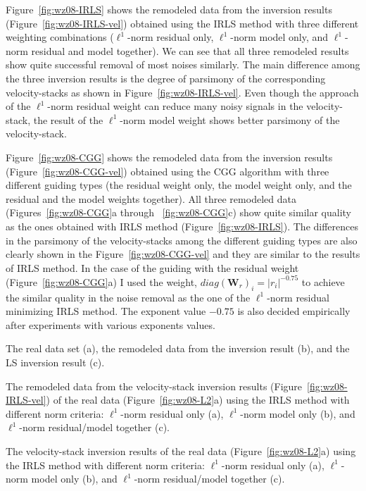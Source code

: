 Figure~\ref{fig:wz08-IRLS} shows the remodeled data
from the inversion results (Figure~\ref{fig:wz08-IRLS-vel}) obtained using the IRLS method 
with three different weighting combinations ($\ell^1$-norm residual only, $\ell^1$-norm model only,
and $\ell^1$-norm residual and model together).
We can see that all three remodeled results show quite successful removal of most noises similarly.
The main difference among the three inversion results is the degree of parsimony 
of the corresponding velocity-stacks as shown in Figure~\ref{fig:wz08-IRLS-vel}.
Even though the approach of the $\ell^1$-norm residual weight can reduce many noisy signals in 
the velocity-stack, the result of the $\ell^1$-norm model weight shows better parsimony of the velocity-stack.

Figure~\ref{fig:wz08-CGG} shows the remodeled data
from the inversion results (Figure~\ref{fig:wz08-CGG-vel})
obtained using the CGG algorithm with three different guiding types
(the residual weight only, the model weight only,
and the residual and the model weights together).
All three remodeled data (Figures~\ref{fig:wz08-CGG}a through ~\ref{fig:wz08-CGG}c)
show quite similar quality as the ones obtained with IRLS method (Figure~\ref{fig:wz08-IRLS}).
The differences in the parsimony of the velocity-stacks 
among the different guiding types are also clearly shown 
in the Figure~\ref{fig:wz08-CGG-vel} and they are similar to the results of IRLS method.
In the case of the guiding with the residual weight (Figure~\ref{fig:wz08-CGG}a)
I used the weight, $diag({\mathbf W_r})_i = |r_i|^{-0.75}$ to achieve 
the similar quality in the noise removal as the one of the $\ell^1$-norm residual minimizing IRLS method.
The exponent value $-0.75$ is also decided empirically after experiments with various exponents values.

{The real data set (a), the remodeled data from the inversion result (b), and the LS inversion result (c).}

{The remodeled data from the velocity-stack inversion results (Figure~\protect\ref{fig:wz08-IRLS-vel}) 
of the real data (Figure~\protect\ref{fig:wz08-L2}a) using the IRLS method with
different norm criteria: $\ell^1$-norm residual only (a), $\ell^1$-norm model only (b),
and $\ell^1$-norm residual/model together (c).}

{The velocity-stack inversion results of the real data 
(Figure~\protect\ref{fig:wz08-L2}a) using the IRLS method with
different norm criteria: $\ell^1$-norm residual only (a), $\ell^1$-norm model only (b),
and $\ell^1$-norm residual/model together (c).}

